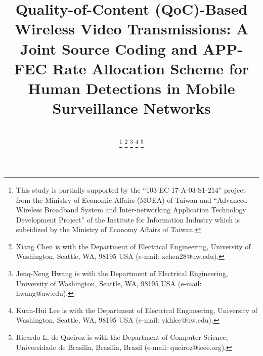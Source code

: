 \documentclass[journal]{IEEEtran}
\begin{document}
%
\title{Quality-of-Content (QoC)-Based Wireless Video Transmissions: A Joint Source Coding and APP-FEC Rate Allocation Scheme for Human Detections in Mobile Surveillance Networks}


\author{   \\
\thanks{This study is partially supported by the “103-EC-17-A-03-S1-214” project from the Ministry of Economic Affairs (MOEA) of Taiwan and “Advanced Wireless Broadband System and Inter-networking Application Technology Development Project” of the Institute for Information Industry which is subsidized by the Ministry of Economy Affairs of Taiwan.}
\thanks{Xiang Chen is with the Department
of Electrical Engineering, University of Washington, Seattle,
WA, 98195 USA (e-mail: xchen28@uw.edu).}%
\thanks{Jenq-Neng Hwang is with the Department
of Electrical Engineering, University of Washington, Seattle,
WA, 98195 USA (e-mail: hwang@uw.edu).}%
\thanks{Kuan-Hui Lee is with the Department
of Electrical Engineering, University of Washington, Seattle,
WA, 98195 USA (e-mail: ykhlee@uw.edu).}
\thanks{Ricardo L. de Queiroz is with the Department
of Computer Science, Universidade de Brasilia, Brasilia, Brazil (e-mail: queiroz@ieee.org).}

}

\maketitle
\end{document}
